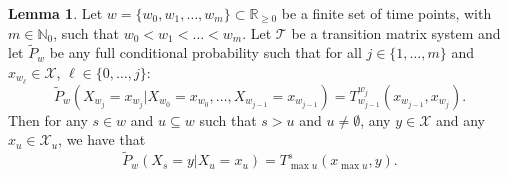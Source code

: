 \documentclass[10pt,a4paper]{paper}
\theoremstyle{definition}
\newtheorem{lemma}[theorem]{Lemma}
\newcommand{\nats}{\mathbb{N}}
\newcommand{\reals}{\mathbb{R}}
\newcommand{\states}{\mathcal{X}}
\begin{document}
\begin{lemma}\label{lemma:simplechainextend}
Let $w=\{w_0,w_1,\dots,w_m\}\subset\reals_{\geq0}$ be a finite set of time points, with $m\in\nats_0$, such that $w_0<w_1<\dots<w_m$. Let $\mathcal{T}$ be a transition matrix system and let $\tilde{P}_w$ be any full conditional probability such that for all $j\in\{1,\dots,m\}$ and $x_{w_{\ell}}\in\states$, $\ell\in\{0,\dots,j\}$:
\begin{equation*}
\tilde{P}_w(X_{w_j}=x_{w_j}\vert X_{w_0}=x_{w_0},\dots,X_{w_{j-1}}=x_{w_{j-1}})=T_{w_{j-1}}^{w_j}(x_{w_{j-1}},x_{w_j}).
\end{equation*}
Then for any $s\in w$ and $u\subseteq w$ such that $s>u$ and $u\neq\emptyset$, any $y\in\states$ and any $x_u\in\states_u$, we have that
\begin{equation*}
\tilde{P}_w(X_s=y\vert X_u=x_u)
=T_{\max u}^s(x_{\max u},y).
\end{equation*}
\end{lemma}
\end{document}
